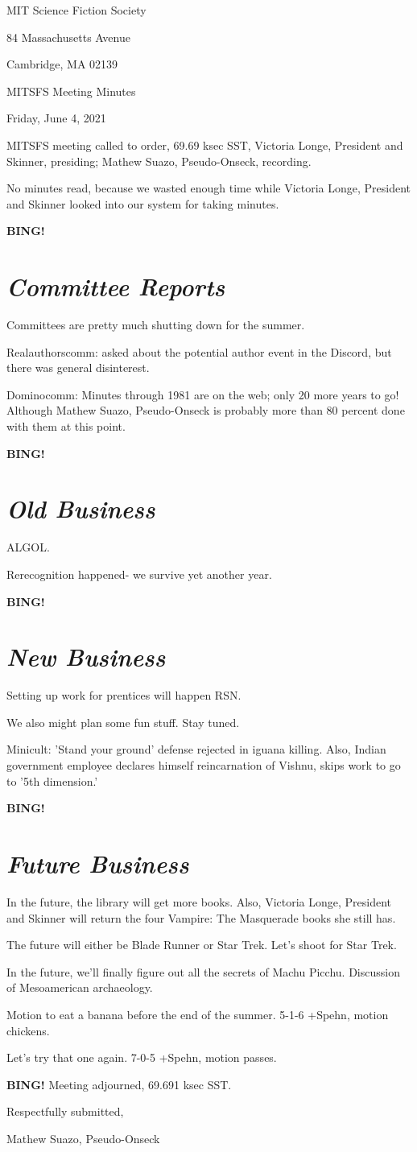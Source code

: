 \documentclass[10pt]{article}
\newcommand{\bing}{{\bf BING!} }
\newcommand{\goto}[1]{\bing \vskip 12pt \section*{{\em{#1}}}}
\newcommand{\skinner}{Victoria Longe, President and Skinner\xspace}
\newcommand{\onseck}{Mathew Suazo, Pseudo-Onseck\xspace}
\newcommand{\meetingdate}{Friday, June 4, 2021}
\begin{document}
\begin{center}

MIT Science Fiction Society

84 Massachusetts Avenue

Cambridge, MA 02139

\vspace{12pt}

MITSFS Meeting Minutes

\meetingdate

\end{center}

\vspace{18pt}

\setlength{\parskip}{6pt}

\noindent
MITSFS meeting called to order, 69.69 ksec SST,
\skinner, presiding; \onseck, recording.

No minutes read, because we wasted enough time while \skinner looked into our system for taking minutes.

\goto{Committee Reports}

Committees are pretty much shutting down for the summer.

Realauthorscomm: asked about the potential author event in the Discord, but there was general disinterest.

Dominocomm: Minutes through 1981 are on the web; only 20 more years to go! Although \onseck is probably more than 80 percent done with them at this point.

\goto{Old Business}

ALGOL.

Rerecognition happened- we survive yet another year.

\goto{New Business}

Setting up work for prentices will happen RSN.

We also might plan some fun stuff. Stay tuned.

Minicult: 'Stand your ground' defense rejected in iguana killing. Also, Indian government employee declares himself reincarnation of Vishnu, skips work to go to '5th dimension.'

\goto{Future Business}

In the future, the library will get more books. Also, \skinner will return the four Vampire: The Masquerade books she still has.

The future will either be Blade Runner or Star Trek. Let's shoot for Star Trek.

In the future, we'll finally figure out all the secrets of Machu Picchu. Discussion of Mesoamerican archaeology.

Motion to eat a banana before the end of the summer. 5-1-6 +Spehn, motion chickens.

Let's try that one again. 7-0-5 +Spehn, motion passes.

\bing
\noindent
Meeting adjourned, 69.691 ksec SST.

\vspace{18pt}

\centerline{Respectfully submitted,}
\centerline{\onseck}
\end{document}
